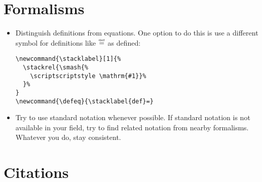 \section{Formalisms}

\begin{itemize}
\item{} Distinguish definitions from equations. One option to do this is use a different symbol
  for definitions like $ \defeq $ as defined:

\begin{verbatim}
\newcommand{\stacklabel}[1]{%
  \stackrel{\smash{%
    \scriptscriptstyle \mathrm{#1}}%
  }%
}
\newcommand{\defeq}{\stacklabel{def}=}
\end{verbatim}

\item{} Try to use standard notation whenever possible. If standard notation is not available in
  your field, try to find related notation from nearby formalisms. Whatever you do, stay
  consistent.
\end{itemize}


\section{Citations}

